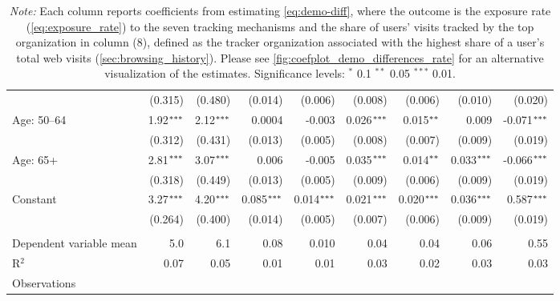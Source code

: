\documentclass[12pt, letterpaper]{article}
\begin{document}
\begin{table}[!ht]
\begin{adjustbox}{max width=\textwidth}
\begin{tabular}{@{\hspace{0\tabcolsep}}l*{8}{D{.}{.}{-1}}@{\hspace{0\tabcolsep}}}
                              & (0.315)       & (0.480)       & (0.014)       & (0.006)       & (0.008)                & (0.006)                & (0.010)       & (0.020)\\   
      Age: 50--64             & 1.92$\sym{***}$  & 2.12$\sym{***}$  & 0.0004        & -0.003        & 0.026$\sym{***}$          & 0.015$\sym{**}$           & 0.009         & -0.071$\sym{***}$\\   
                              & (0.312)       & (0.431)       & (0.013)       & (0.005)       & (0.008)                & (0.007)                & (0.009)       & (0.019)\\   
      Age: 65+                & 2.81$\sym{***}$  & 3.07$\sym{***}$  & 0.006         & -0.005        & 0.035$\sym{***}$          & 0.014$\sym{**}$           & 0.033$\sym{***}$ & -0.066$\sym{***}$\\   
                              & (0.318)       & (0.449)       & (0.013)       & (0.005)       & (0.009)                & (0.006)                & (0.009)       & (0.019)\\   
      Constant                & 3.27$\sym{***}$  & 4.20$\sym{***}$  & 0.085$\sym{***}$ & 0.014$\sym{***}$ & 0.021$\sym{***}$          & 0.020$\sym{***}$          & 0.036$\sym{***}$ & 0.587$\sym{***}$\\   
                              & (0.264)       & (0.400)       & (0.014)       & (0.005)       & (0.007)                & (0.006)                & (0.009)       & (0.019)\\   
       \\
      Dependent variable mean & 5.0           & 6.1           & 0.08          & 0.010         & 0.04                   & 0.04                   & 0.06          & 0.55\\  
      R$^2$                   & 0.07          & 0.05          & 0.01          & 0.01          & 0.03                   & 0.02                   & 0.03          & 0.03\\  
      Observations &  &  &  &  &  &  &  & \\
      \bottomrule
   \end{tabular}
\end{adjustbox}
\par\endgroup
\caption*{
    \footnotesize \textit{Note:}
    Each column reports coefficients from estimating \cref{eq:demo-diff},
    where the outcome is the exposure rate (\cref{eq:exposure_rate}) to the seven tracking mechanisms and the share of users' visits tracked by the top organization in column (8), defined as the tracker organization associated with the highest share of a user's total web visits (\cref{sec:browsing_history}).
    Please see \cref{fig:coefplot_demo_differences_rate} for an alternative visualization of the estimates.
    Significance levels: $^{*}$ 0.1 $^{**}$ 0.05 $^{***}$ 0.01.
}
\end{table}
\end{document}
